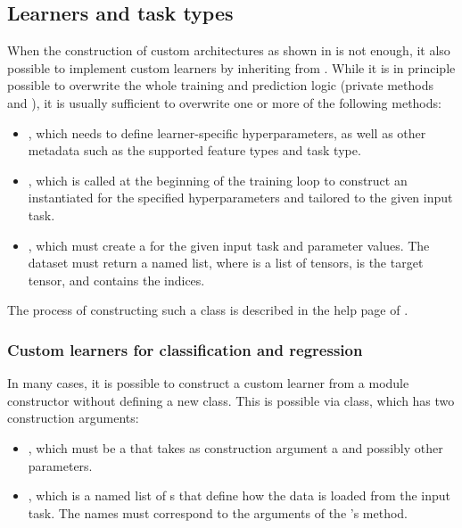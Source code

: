 \documentclass[article]{jss}
\theoremstyle{definition}
\begin{document}
\subsection{Learners and task types}\label{sec:extending-learner-task}

When the construction of custom architectures as shown in  is not enough, it also possible to implement custom learners by inheriting from .
While it is in principle possible to overwrite the whole training and prediction logic (private methods  and ), it is usually sufficient to overwrite one or more of the following methods:
\begin{itemize}
    \item {}, which needs to define learner-specific hyperparameters, as well as other metadata such as the supported feature types and task type.
    \item {}, which is called at the beginning of the training loop to construct an instantiated  for the specified hyperparameters and tailored to the given input task.
    \item {}, which must create a  for the given input task and parameter values. The dataset must return a named list, where  is a list of tensors,  is the target tensor, and  contains the indices.
\end{itemize}

The process of constructing such a class is described in the help page of .

\subsubsection{Custom learners for classification and regression}\label{sec:extending-learner}

In many cases, it is possible to construct a custom learner from a module constructor without defining a new class.
This is possible via  class, which has two construction arguments:
\begin{itemize}
    \item {}, which must be a  that takes as construction argument a  and possibly other parameters.
    \item {}, which is a named list of s that define how the data is loaded from the input task. The names must correspond to the arguments of the 's  method.
\end{itemize}
\end{document}

